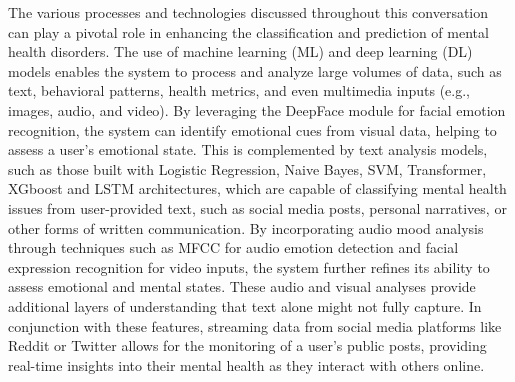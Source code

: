 \noindent
The various processes and technologies discussed throughout this conversation can play a pivotal role in enhancing the classification and prediction of mental health disorders. The use of machine learning (ML) and deep learning (DL) models enables the system to process and analyze large volumes of data, such as text, behavioral patterns, health metrics, and even multimedia inputs (e.g., images, audio, and video). By leveraging the DeepFace module for facial emotion recognition, the system can identify emotional cues from visual data, helping to assess a user’s emotional state. This is complemented by text analysis models, such as those built with Logistic Regression, Naive Bayes, SVM, Transformer, XGboost and LSTM architectures, which are capable of classifying mental health issues from user-provided text, such as social media posts, personal narratives, or other forms of written communication. By incorporating audio mood analysis through techniques such as MFCC for audio emotion detection and facial expression recognition for video inputs, the system further refines its ability to assess emotional and mental states. These audio and visual analyses provide additional layers of understanding that text alone might not fully capture. In conjunction with these features, streaming data from social media platforms like Reddit or Twitter allows for the monitoring of a user’s public posts, providing real-time insights into their mental health as they interact with others online. 












